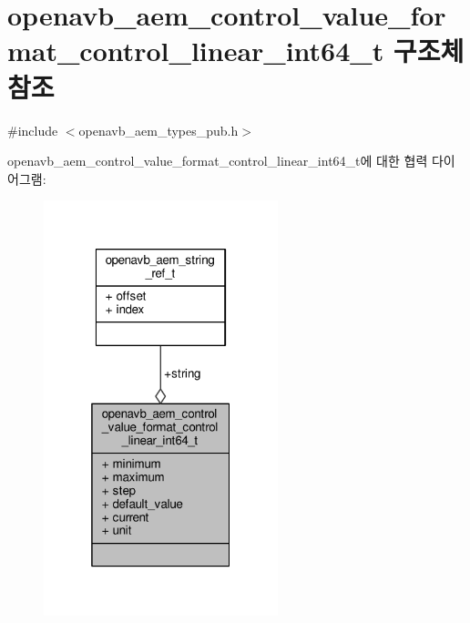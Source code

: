 \hypertarget{structopenavb__aem__control__value__format__control__linear__int64__t}{}\section{openavb\+\_\+aem\+\_\+control\+\_\+value\+\_\+format\+\_\+control\+\_\+linear\+\_\+int64\+\_\+t 구조체 참조}
\label{structopenavb__aem__control__value__format__control__linear__int64__t}


{\ttfamily \#include $<$openavb\+\_\+aem\+\_\+types\+\_\+pub.\+h$>$}



openavb\+\_\+aem\+\_\+control\+\_\+value\+\_\+format\+\_\+control\+\_\+linear\+\_\+int64\+\_\+t에 대한 협력 다이어그램\+:
\nopagebreak
\begin{figure}[H]
\begin{center}
\leavevmode
\includegraphics[width=193pt]{structopenavb__aem__control__value__format__control__linear__int64__t__coll__graph}
\end{center}
\end{figure}
